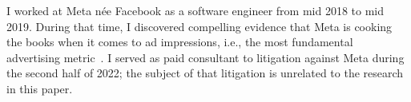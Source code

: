 I worked at Meta n\'ee Facebook as a software engineer from mid 2018 to mid
2019. During that time, I discovered compelling evidence that Meta is cooking
the books when it comes to ad impressions, i.e., the most fundamental
advertising metric~\cite{grimm2022a}. I served as paid consultant to litigation
against Meta during the second half of 2022; the subject of that litigation is
unrelated to the research in this paper.
